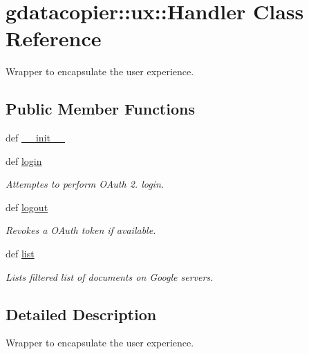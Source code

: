 \hypertarget{classgdatacopier_1_1ux_1_1_handler}{\section{gdatacopier\-:\-:ux\-:\-:\-Handler \-Class \-Reference}
\label{classgdatacopier_1_1ux_1_1_handler}
}


\-Wrapper to encapsulate the user experience.  


\subsection*{\-Public \-Member \-Functions}
\begin{DoxyCompactItemize}
\item 
def \hyperlink{classgdatacopier_1_1ux_1_1_handler_abad42c564d4ddd13c15b1b5544292766}{\-\_\-\-\_\-init\-\_\-\-\_\-}
\item 
def \hyperlink{classgdatacopier_1_1ux_1_1_handler_a65f36ef3153d8bcdf4a2e2db9c4a8381}{login}
\begin{DoxyCompactList}\small\item\em \-Attemptes to perform \-O\-Auth 2. login. \end{DoxyCompactList}\item 
def \hyperlink{classgdatacopier_1_1ux_1_1_handler_af5c0d73a7a2809d367e3405d750efec9}{logout}
\begin{DoxyCompactList}\small\item\em \-Revokes a \-O\-Auth token if available. \end{DoxyCompactList}\item 
def \hyperlink{classgdatacopier_1_1ux_1_1_handler_a1c39beaf95ce9dba251a064c75187636}{list}
\begin{DoxyCompactList}\small\item\em \-Lists filtered list of documents on \-Google servers. \end{DoxyCompactList}\end{DoxyCompactItemize}


\subsection{\-Detailed \-Description}
\-Wrapper to encapsulate the user experience. 



